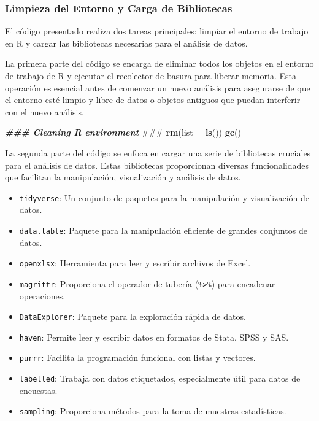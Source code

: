 \documentclass[
  12pt,
]{book}
\newenvironment{Shaded}{\begin{snugshade}}{\end{snugshade}}
\newcommand{\AlertTok}[1]{\textcolor[rgb]{0.94,0.16,0.16}{#1}}
\newcommand{\AttributeTok}[1]{\textcolor[rgb]{0.13,0.29,0.53}{#1}}
\newcommand{\DocumentationTok}[1]{\textcolor[rgb]{0.56,0.35,0.01}{\textbf{\textit{#1}}}}
\newcommand{\FunctionTok}[1]{\textcolor[rgb]{0.13,0.29,0.53}{\textbf{#1}}}
\newcommand{\NormalTok}[1]{#1}
\providecommand{\tightlist}{%
  \setlength{\itemsep}{0pt}\setlength{\parskip}{0pt}}
\begin{document}
\hypertarget{limpieza-del-entorno-y-carga-de-bibliotecas-1}{%
\subsubsection*{Limpieza del Entorno y Carga de Bibliotecas}\label{limpieza-del-entorno-y-carga-de-bibliotecas-1}}

El código presentado realiza dos tareas principales: limpiar el entorno de trabajo en R y cargar las bibliotecas necesarias para el análisis de datos.

La primera parte del código se encarga de eliminar todos los objetos en el entorno de trabajo de R y ejecutar el recolector de basura para liberar memoria. Esta operación es esencial antes de comenzar un nuevo análisis para asegurarse de que el entorno esté limpio y libre de datos o objetos antiguos que puedan interferir con el nuevo análisis.

\begin{Shaded}
\begin{Highlighting}[]
\DocumentationTok{\#\#\# Cleaning R environment }\AlertTok{\#\#\#}
\FunctionTok{rm}\NormalTok{(}\AttributeTok{list =} \FunctionTok{ls}\NormalTok{())}
\FunctionTok{gc}\NormalTok{()}
\end{Highlighting}
\end{Shaded}

La segunda parte del código se enfoca en cargar una serie de bibliotecas cruciales para el análisis de datos. Estas bibliotecas proporcionan diversas funcionalidades que facilitan la manipulación, visualización y análisis de datos.

\begin{itemize}
\tightlist
\item
  \texttt{tidyverse}: Un conjunto de paquetes para la manipulación y visualización de datos.
\item
  \texttt{data.table}: Paquete para la manipulación eficiente de grandes conjuntos de datos.
\item
  \texttt{openxlsx}: Herramienta para leer y escribir archivos de Excel.
\item
  \texttt{magrittr}: Proporciona el operador de tubería (\texttt{\%\textgreater{}\%}) para encadenar operaciones.
\item
  \texttt{DataExplorer}: Paquete para la exploración rápida de datos.
\item
  \texttt{haven}: Permite leer y escribir datos en formatos de Stata, SPSS y SAS.
\item
  \texttt{purrr}: Facilita la programación funcional con listas y vectores.
\item
  \texttt{labelled}: Trabaja con datos etiquetados, especialmente útil para datos de encuestas.
\item
  \texttt{sampling}: Proporciona métodos para la toma de muestras estadísticas.
\end{itemize}
\end{document}
